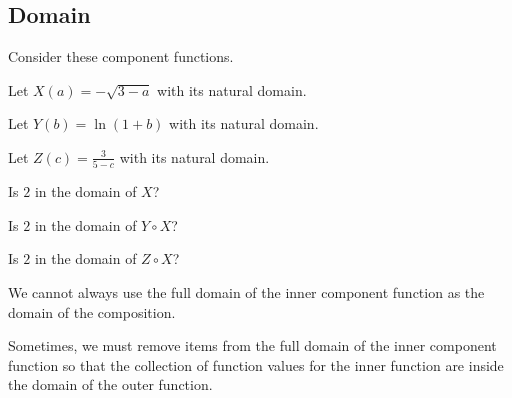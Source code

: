 \documentclass{ximera}
\begin{document}
\subsection*{Domain}



Consider these component functions.

Let $X(a) = -\sqrt{3 - a}$ with its natural domain.


Let $Y(b) = \ln(1 + b)$ with its natural domain.


Let $Z(c) = \frac{3}{5 - c}$ with its natural domain.



\begin{question}

Is $2$ in the domain of $X$?

\begin{multipleChoice}
\end{multipleChoice}

\end{question}





\begin{question}

Is $2$ in the domain of $Y \circ X$?

\begin{multipleChoice}
\end{multipleChoice}

\end{question}



\begin{question}

Is $2$ in the domain of $Z \circ X$?

\begin{multipleChoice}
\end{multipleChoice}

\end{question}



We cannot always use the full domain of the inner component function as the domain of the composition.

Sometimes, we must remove items from the full domain of the inner component function so that the collection of function values for the inner function are inside the domain of the outer function.
\end{document}
